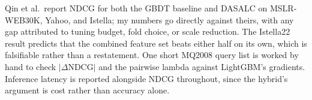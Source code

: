 \documentclass[11pt]{article}
\newcommand{\head}[1]{\smallskip\noindent{\color{DarkBlue}\textbf{#1}}}
\begin{document}
\head{Evaluation.}
Qin et al.\ report NDCG for both the GBDT baseline and DASALC on MSLR-WEB30K, Yahoo, and Istella; my numbers go directly against theirs, with any gap attributed to tuning budget, fold choice, or scale reduction. The Istella22 result predicts that the combined feature set beats either half on its own, which is falsifiable rather than a restatement. One short MQ2008 query list is worked by hand to check $|\Delta\mathrm{NDCG}|$ and the pairwise lambda against LightGBM's gradients. Inference latency is reported alongside NDCG throughout, since the hybrid's argument is cost rather than accuracy alone.
\end{document}
